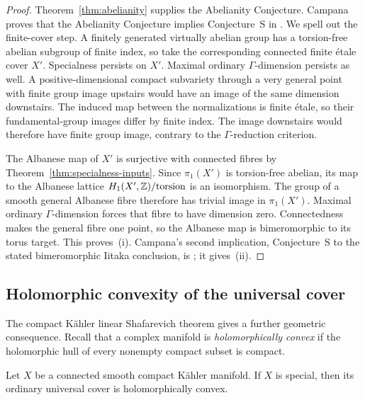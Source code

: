 \begin{proof}
Theorem~\ref{thm:abelianity} supplies the Abelianity Conjecture.
Campana proves that the Abelianity Conjecture implies Conjecture~S in
\cite[Remark~A.4(3)]{ClaudonHoring2013}. We spell out the
finite-cover step. A finitely generated virtually abelian group has
a torsion-free abelian subgroup of finite index, so take the
corresponding connected finite \'etale cover \(X'\).
Specialness persists on \(X'\). Maximal ordinary
\(\Gamma\)-dimension persists as well. A positive-dimensional compact
subvariety through a very general point with finite group image
upstairs would have an image of the same dimension downstairs.
The induced map between the normalizations is finite \'etale, so
their fundamental-group images differ by finite index. The image
downstairs would therefore have finite group image, contrary to the
\(\Gamma\)-reduction criterion.

The Albanese map of \(X'\) is surjective with connected fibres by
Theorem~\ref{thm:specialness-inputs}. Since \(\pi_1(X')\) is
torsion-free abelian, its map to the Albanese lattice
\(H_1(X',\mathbb Z)/\mathrm{torsion}\) is an isomorphism. The group of a
smooth general Albanese fibre therefore has trivial image in
\(\pi_1(X')\). Maximal ordinary \(\Gamma\)-dimension forces that
fibre to have dimension zero. Connectedness makes the general fibre
one point, so the Albanese map is bimeromorphic to its torus target.
This proves~\textup{(i)}. Campana's second implication,
Conjecture~S to the stated bimeromorphic Iitaka conclusion, is
\cite[Remark~A.4(2)]{ClaudonHoring2013}; it gives~\textup{(ii)}.
\end{proof}

\subsection{Holomorphic convexity of the universal cover}

The compact K\"ahler linear Shafarevich theorem gives a further
geometric consequence. Recall that a complex manifold is
\emph{holomorphically convex} if the holomorphic hull of every nonempty
compact subset is compact.

\begin{corollary}
\label{cor:special-shafarevich}
Let \(X\) be a connected smooth compact K\"ahler manifold. If \(X\) is
special, then its ordinary universal cover is holomorphically convex.
\end{corollary}

